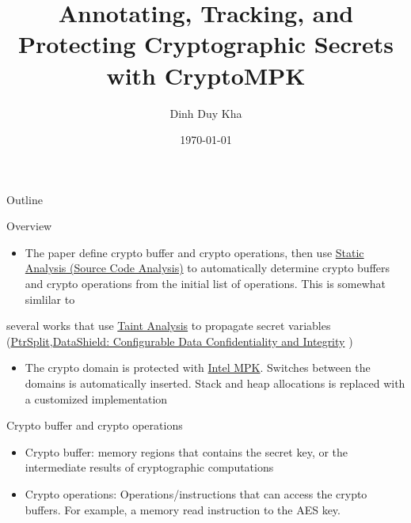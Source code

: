 \documentclass[presentation]{beamer}
\author{Dinh Duy Kha}
\date{\today}
\title{Annotating, Tracking, and Protecting Cryptographic Secrets with CryptoMPK}
\begin{document}
\maketitle
\begin{frame}{Outline}
\tableofcontents
\end{frame}

\begin{frame}[label={sec:orgee09e19}]{Overview}
\begin{itemize}
\item The paper define crypto buffer and crypto operations, then use \href{20211116135548-static_analysis_source_code_analysis.org}{Static Analysis (Source Code Analysis)} to automatically determine crypto buffers and crypto operations from the initial list of operations. This is somewhat simlilar to
\end{itemize}
several works that use \href{20211116143831-taint_analysis.org}{Taint Analysis} to propagate secret variables (\href{20211111131609-ptrsplit.org}{PtrSplit},\href{20211116123706-datashield_configurable_data_confidentiality_and_integrity.org}{DataShield: Configurable Data Confidentiality and Integrity} )

\begin{itemize}
\item The crypto domain is protected with \href{20210909115814-intel_mpk.org}{Intel MPK}. Switches between the domains is automatically inserted. Stack and heap allocations is replaced with a customized implementation
\end{itemize}
\end{frame}

\begin{frame}[label={sec:orgad8ddd9}]{Crypto buffer and crypto operations}
\begin{itemize}
\item \alert{Crypto buffer:} memory regions that contains the secret key, or the intermediate results of cryptographic computations
\item \alert{Crypto operations:} Operations/instructions that can access the crypto buffers. For example, a memory read instruction to the AES key.
\end{itemize}
\end{frame}
\end{document}
